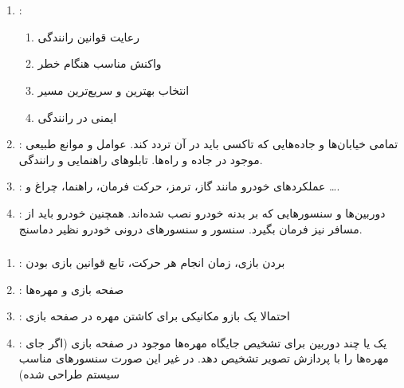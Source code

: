 \documentclass{university}
\begin{document}
\setupdocument

\section{}

\subsection{}
\subsubsection{}
\begin{enumerate}
    \item {} :
    \begin{enumerate}
        \item رعایت قوانین رانندگی
        \item واکنش مناسب هنگام خطر
        \item انتخاب بهترین و سریع‌ترین مسیر
        \item ایمنی در رانندگی
    \end{enumerate}
    \item {} :
    تمامی خیابان‌ها و 
    جاده‌هایی که تاکسی باید در آن تردد کند. عوامل و موانع طبیعی موجود در جاده و راه‌ها. تابلوهای راهنمایی و رانندگی.
    \item {} :
    عملکردهای خودرو مانند گاز، ترمز، حرکت 
    فرمان، راهنما، چراغ و \dots.
    \item {} : 
    دوربین‌ها و سنسورهایی که بر بدنه خودرو نصب 
    شده‌اند. همچنین خودرو باید از مسافر نیز فرمان 
    بگیرد. سنسور 
     و 
    سنسورهای درونی خودرو نظیر دماسنج.

\end{enumerate}
\subsubsection{}
\begin{enumerate}
    \item {} : بردن بازی، زمان انجام هر حرکت، تابع قوانین بازی بودن
    \item {} : صفحه بازی و مهره‌ها 
    \item {} : احتمالا یک بازو مکانیکی برای کاشتن مهره در صفحه بازی
    \item {} : یک یا چند دوربین برای تشخیص جایگاه مهره‌ها موجود در صفحه بازی (اگر جای مهره‌ها را با پردازش تصویر تشخیص دهد. در غیر این صورت سنسورهای مناسب سیستم طراحی شده)
\end{enumerate}
\end{document}
